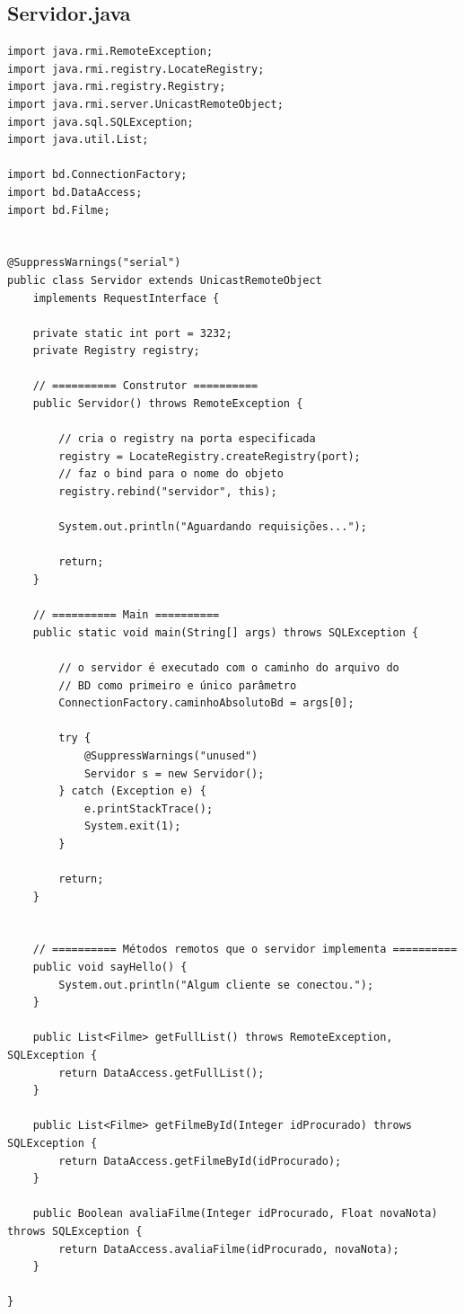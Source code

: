 \documentclass[11pt,twoside]{article}
\begin{document}
\subsection{Servidor.java}       %
\begin{verbatim}
import java.rmi.RemoteException;
import java.rmi.registry.LocateRegistry;
import java.rmi.registry.Registry;
import java.rmi.server.UnicastRemoteObject;
import java.sql.SQLException;
import java.util.List;

import bd.ConnectionFactory;
import bd.DataAccess;
import bd.Filme;


@SuppressWarnings("serial")
public class Servidor extends UnicastRemoteObject 
	implements RequestInterface {

	private static int port = 3232;
	private Registry registry;

	// ========== Construtor ==========
	public Servidor() throws RemoteException {

		// cria o registry na porta especificada
		registry = LocateRegistry.createRegistry(port);
		// faz o bind para o nome do objeto
		registry.rebind("servidor", this);
		
		System.out.println("Aguardando requisições...");
		
		return;
	}
	
	// ========== Main ==========
	public static void main(String[] args) throws SQLException {

		// o servidor é executado com o caminho do arquivo do
		// BD como primeiro e único parâmetro
		ConnectionFactory.caminhoAbsolutoBd = args[0];

		try {
			@SuppressWarnings("unused")
			Servidor s = new Servidor();
		} catch (Exception e) {
			e.printStackTrace();
			System.exit(1);
		}
	
		return;
	}
	
	
	// ========== Métodos remotos que o servidor implementa ==========
	public void sayHello() {
		System.out.println("Algum cliente se conectou.");
	}

	public List<Filme> getFullList() throws RemoteException, SQLException {
		return DataAccess.getFullList();
	}
	
	public List<Filme> getFilmeById(Integer idProcurado) throws SQLException {
		return DataAccess.getFilmeById(idProcurado);
	}

	public Boolean avaliaFilme(Integer idProcurado, Float novaNota) throws SQLException {
		return DataAccess.avaliaFilme(idProcurado, novaNota);
	}

}
\end{verbatim}
\end{document}
